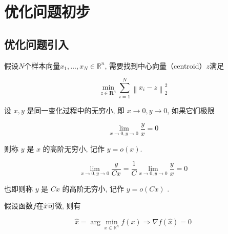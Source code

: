\chapter{优化问题初步}
    
\section{优化问题引入}

\begin{problem}
    \label{Problem:ClusteringCenter}
    假设$N$个样本向量$ x_{1}, \ldots, x_{N} \in \mathbb{R}^{n} $, 需要找到中心向量（centroid）$z$满足

    $$ \min _{z \in \mathbf{R}^{n}} \sum_{i=1}^{N}\left\|x_{i}-z\right\|_{2}^{2} $$
\end{problem}

\begin{definition}[高阶无穷小记号 $o$]
    设 $ x, y $ 是同一变化过程中的无穷小, 即 $ x \rightarrow 0, y \rightarrow 0 $, 如果它们极限

$$
\lim_{x \rightarrow 0, y \rightarrow 0} \frac{y}{x}=0
$$

则称 $ y $ 是 $ x $ 的高阶无穷小, 记作 $ y=o(x) $.
\end{definition}

\begin{corollary}
    $$ \lim_{x \rightarrow 0, y \rightarrow 0} \frac{y}{C x}=\frac{1}{C} \lim_{x \rightarrow 0, y \rightarrow 0} \frac{y}{x}=0 $$

    也即则称 $ y $ 是 $ C x $ 的高阶无穷小, 记作 $ y=o(C x) $ . 
\end{corollary}

\begin{theorem}[优化求解的必要条件]
    假设函数$f$在$\hat{x}$可微, 则有

    $$ \hat{x}=\arg \min _{x \in \mathbb{R}^{n}} f(x) \Rightarrow \nabla f(\hat{x})=0 $$
\end{theorem}

